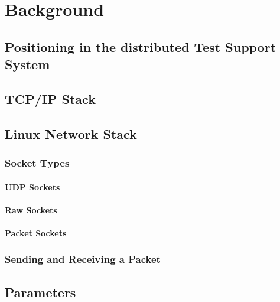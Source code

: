 \chapter{Background}


\section{Positioning in the distributed Test Support System}


\section{TCP/IP Stack}


\section{Linux Network Stack}


\subsection{Socket Types}


\subsubsection{UDP Sockets}


\subsubsection{Raw Sockets}


\subsubsection{Packet Sockets}


\subsection{Sending and Receiving a Packet}


\section{Parameters}
